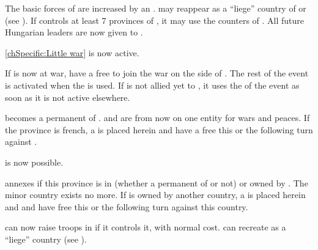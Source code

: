 \effetlong
\aparag The basic forces of \HAB are increased by an \ARMY\facemoins.
\aparag \paysHongrie may reappear as a ``liege'' country of \HAB or \SPA (see
). %
\aparag If \HAB controls at least 7 provinces of \paysHongrie, it may use the
counters of \paysHongrie.
\aparag All future Hungarian leaders are now given to \HAB.

\aparag[] [BLP] \ref{chSpecific:Little war} is now active.




\aparag If \paysMilan is now at war, \HAB have a free \CB to join the war on
the side of \paysMilan. The rest of the event is activated when the \CB is
used.
\aparag If \HAB is not allied yet to \SPA, it uses the \CB of the event as
soon as it is not active elsewhere.

\phevnt
\aparag \paysMilan becomes a permanent \VASSAL of \HAB. \paysMilan and \HAB
are from now on one entity for wars and peaces.
\aparag If the province \provinceLombardia is french, a \REVOLT \facemoins is
placed herein and \HAB have a free \CB this or the following turn against
\FRA.

\effetlong
\aparag {} is now possible.






\phevnt
\aparag \SPA annexes \provinceLombardia if this province is in \paysMilan
(whether a permanent \VASSAL of \HAB or not) or owned by \HAB. The minor
country \paysMilan exists no more.
\aparag If \provinceLombardia is owned by another country, a \REVOLT
\facemoins is placed herein and \SPA and \HAB have free \CB this or the
following turn against this country.

\effetlong
\aparag \SPA can now raise troops in \provinceLombardia if it controls it,
with normal cost.
\aparag \SPA can recreate \paysMilan as a ``liege'' country (see
).




